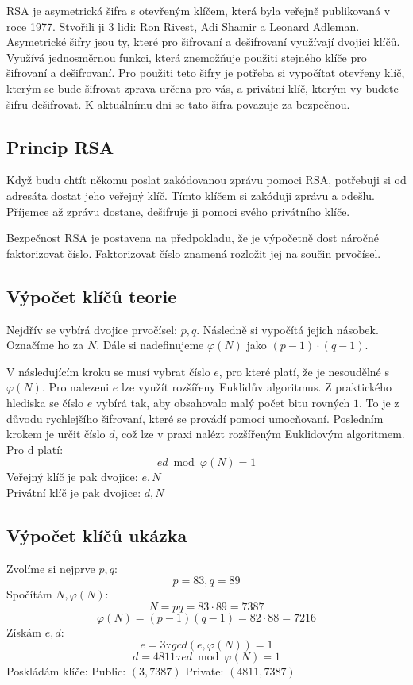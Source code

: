 \documentclass[11pt]{article}
\begin{document}
RSA je asymetrická šifra s otevřeným klíčem, která byla veřejně publikovaná v roce 1977.
Stvořili ji 3 lidi: Ron Rivest, Adi Shamir a Leonard Adleman.
Asymetrické šifry jsou ty, které pro šifrovaní a dešifrovaní využívají dvojici klíčů.
Využívá jednosměrnou funkci, která znemožňuje použiti stejného klíče pro šifrovaní a dešifrovaní.
Pro použiti teto šifry je potřeba si vypočítat otevřeny klíč, kterým se bude šifrovat zprava určena pro vás, a privátní klíč, kterým vy budete šifru dešifrovat.
K aktuálnímu dni se tato šifra povazuje za bezpečnou.

\subsection{Princip RSA}
Když budu chtít někomu poslat zakódovanou zprávu pomoci RSA, potřebuji si od adresáta dostat jeho veřejný klíč.
Tímto klíčem si zakóduji zprávu a odešlu.
Příjemce až zprávu dostane, dešifruje ji pomoci svého privátního klíče.
\par Bezpečnost RSA je postavena na předpokladu, že je výpočetně dost náročné faktorizovat číslo.
Faktorizovat číslo znamená rozložit jej na součin prvočísel.

\subsection{Výpočet klíčů teorie}
Nejdřív se vybírá dvojice prvočísel: $p, q$.
Následně si vypočítá jejich násobek. Označíme ho za $N$.
Dále si nadefinujeme $\varphi (N)$ jako $(p - 1) \cdot (q - 1)$.
\par V následujícím kroku se musí vybrat číslo $e$, pro které platí, že je nesoudělné s $\varphi (N)$.
Pro nalezeni $e$ lze využít rozšířeny Euklidův algoritmus.
Z praktického hlediska se číslo $e$ vybírá tak, aby obsahovalo malý počet bitu rovných $1$.
To je z důvodu rychlejšího šifrovaní, které se provádí pomoci umocňovaní.
Posledním krokem je určit číslo $d$, což lze v praxi nalézt rozšířeným Euklidovým algoritmem.
Pro d platí:
$$ ed \bmod \varphi (N) = 1 $$
Veřejný klíč je pak dvojice: $e, N$ \\
Privátní klíč je pak dvojice: $d, N$

\subsection{Výpočet klíčů ukázka}
\noindent Zvolíme si nejprve $p, q$:
$$p = 83, q = 89$$
Spočítám $N, \varphi (N)$:
$$N = pq = 83 \cdot 89 = 7387$$
$$\varphi (N) = (p - 1)(q - 1) = 82 \cdot 88 = 7216$$
Získám $e, d$:
$$e = 3 \because gcd(e, \varphi (N)) = 1$$
$$d = 4811 \because ed \bmod \varphi (N) = 1$$
Poskládám klíče:
Public: $(3, 7387)$
Private: $(4811, 7387)$
\end{document}
